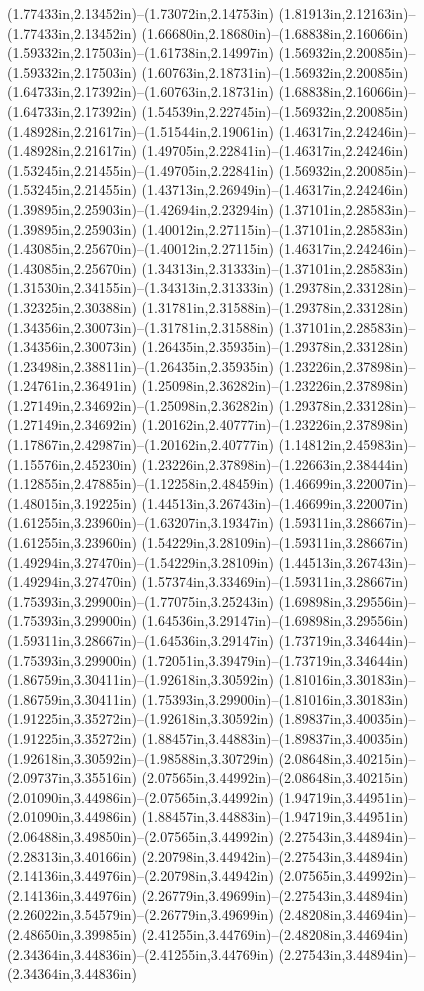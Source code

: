 (1.77433in,2.13452in)--(1.73072in,2.14753in) (1.81913in,2.12163in)--(1.77433in,2.13452in) (1.66680in,2.18680in)--(1.68838in,2.16066in) (1.59332in,2.17503in)--(1.61738in,2.14997in) (1.56932in,2.20085in)--(1.59332in,2.17503in) (1.60763in,2.18731in)--(1.56932in,2.20085in) (1.64733in,2.17392in)--(1.60763in,2.18731in) (1.68838in,2.16066in)--(1.64733in,2.17392in) (1.54539in,2.22745in)--(1.56932in,2.20085in) (1.48928in,2.21617in)--(1.51544in,2.19061in) (1.46317in,2.24246in)--(1.48928in,2.21617in) (1.49705in,2.22841in)--(1.46317in,2.24246in) (1.53245in,2.21455in)--(1.49705in,2.22841in) (1.56932in,2.20085in)--(1.53245in,2.21455in) (1.43713in,2.26949in)--(1.46317in,2.24246in) (1.39895in,2.25903in)--(1.42694in,2.23294in) (1.37101in,2.28583in)--(1.39895in,2.25903in) (1.40012in,2.27115in)--(1.37101in,2.28583in) (1.43085in,2.25670in)--(1.40012in,2.27115in) (1.46317in,2.24246in)--(1.43085in,2.25670in) (1.34313in,2.31333in)--(1.37101in,2.28583in) (1.31530in,2.34155in)--(1.34313in,2.31333in) (1.29378in,2.33128in)--(1.32325in,2.30388in) (1.31781in,2.31588in)--(1.29378in,2.33128in) (1.34356in,2.30073in)--(1.31781in,2.31588in) (1.37101in,2.28583in)--(1.34356in,2.30073in) (1.26435in,2.35935in)--(1.29378in,2.33128in) (1.23498in,2.38811in)--(1.26435in,2.35935in) (1.23226in,2.37898in)--(1.24761in,2.36491in) (1.25098in,2.36282in)--(1.23226in,2.37898in) (1.27149in,2.34692in)--(1.25098in,2.36282in) (1.29378in,2.33128in)--(1.27149in,2.34692in) (1.20162in,2.40777in)--(1.23226in,2.37898in) (1.17867in,2.42987in)--(1.20162in,2.40777in) (1.14812in,2.45983in)--(1.15576in,2.45230in) (1.23226in,2.37898in)--(1.22663in,2.38444in) (1.12855in,2.47885in)--(1.12258in,2.48459in) (1.46699in,3.22007in)--(1.48015in,3.19225in) (1.44513in,3.26743in)--(1.46699in,3.22007in) (1.61255in,3.23960in)--(1.63207in,3.19347in) (1.59311in,3.28667in)--(1.61255in,3.23960in) (1.54229in,3.28109in)--(1.59311in,3.28667in) (1.49294in,3.27470in)--(1.54229in,3.28109in) (1.44513in,3.26743in)--(1.49294in,3.27470in) (1.57374in,3.33469in)--(1.59311in,3.28667in) (1.75393in,3.29900in)--(1.77075in,3.25243in) (1.69898in,3.29556in)--(1.75393in,3.29900in) (1.64536in,3.29147in)--(1.69898in,3.29556in) (1.59311in,3.28667in)--(1.64536in,3.29147in) (1.73719in,3.34644in)--(1.75393in,3.29900in) (1.72051in,3.39479in)--(1.73719in,3.34644in) (1.86759in,3.30411in)--(1.92618in,3.30592in) (1.81016in,3.30183in)--(1.86759in,3.30411in) (1.75393in,3.29900in)--(1.81016in,3.30183in) (1.91225in,3.35272in)--(1.92618in,3.30592in) (1.89837in,3.40035in)--(1.91225in,3.35272in) (1.88457in,3.44883in)--(1.89837in,3.40035in) (1.92618in,3.30592in)--(1.98588in,3.30729in) (2.08648in,3.40215in)--(2.09737in,3.35516in) (2.07565in,3.44992in)--(2.08648in,3.40215in) (2.01090in,3.44986in)--(2.07565in,3.44992in) (1.94719in,3.44951in)--(2.01090in,3.44986in) (1.88457in,3.44883in)--(1.94719in,3.44951in) (2.06488in,3.49850in)--(2.07565in,3.44992in) (2.27543in,3.44894in)--(2.28313in,3.40166in) (2.20798in,3.44942in)--(2.27543in,3.44894in) (2.14136in,3.44976in)--(2.20798in,3.44942in) (2.07565in,3.44992in)--(2.14136in,3.44976in) (2.26779in,3.49699in)--(2.27543in,3.44894in) (2.26022in,3.54579in)--(2.26779in,3.49699in) (2.48208in,3.44694in)--(2.48650in,3.39985in) (2.41255in,3.44769in)--(2.48208in,3.44694in) (2.34364in,3.44836in)--(2.41255in,3.44769in) (2.27543in,3.44894in)--(2.34364in,3.44836in) 